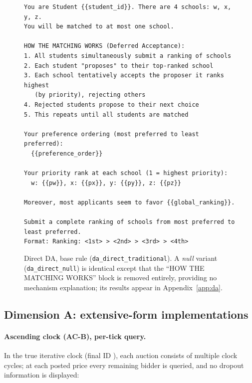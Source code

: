 \begin{figure}[H]
\begin{lstlisting}
You are Student {{student_id}}. There are 4 schools: w, x, y, z.
You will be matched to at most one school.

HOW THE MATCHING WORKS (Deferred Acceptance):
1. All students simultaneously submit a ranking of schools
2. Each student "proposes" to their top-ranked school
3. Each school tentatively accepts the proposer it ranks highest
   (by priority), rejecting others
4. Rejected students propose to their next choice
5. This repeats until all students are matched

Your preference ordering (most preferred to least preferred):
  {{preference_order}}

Your priority rank at each school (1 = highest priority):
  w: {{pw}}, x: {{px}}, y: {{py}}, z: {{pz}}

Moreover, most applicants seem to favor {{global_ranking}}.

Submit a complete ranking of schools from most preferred to
least preferred.
Format: Ranking: <1st> > <2nd> > <3rd> > <4th>
\end{lstlisting}
\caption{Direct DA, base rule (\texttt{da\_direct\_traditional}). A \emph{null} variant (\texttt{da\_direct\_null}) is identical except that the ``HOW THE MATCHING WORKS'' block is removed entirely, providing no mechanism explanation; its results appear in Appendix~\ref{app:da}.}
\label{fig:prompt-da-traditional}
\end{figure}

\subsection{Dimension A: extensive-form implementations}\label{app:prompts-osp}

\paragraph{Ascending clock (AC-B), per-tick query.} In the true iterative clock (final ID ), each auction consists of multiple clock cycles; at each posted price every remaining bidder is queried, and no dropout information is displayed:

